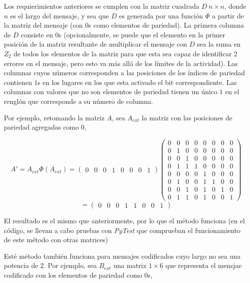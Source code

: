 \documentclass{article}
\begin{document}
Los requierimientos anteriores se cumplen con la matriz cuadrada $D\ n \times n$, donde $n$ es el largo del mensaje, y sea que $D$ es generada por una función $\Phi$ a partir de la matriz del mensaje (con $0$s como elementos de pariedad). La primera columna de $D$ consiste en $0$s (opcionalmente, se puede que el elemento en la primer posición de la matriz resultante de multiplicar el mensaje con $D$ sea la suma en $Z_2$ de todos los elementos de la matriz para que esta sea capaz de identificar 2 errores en el mensaje, pero esto va más allá de los límites de la actividad). Las columnas cuyos números corresponden a las posiciones de los índices de pariedad contienen $1$s en los lugares en los que esta activado el bit correspondiente. Las columnas con valores que no son elementos de pariedad tienen un único $1$ en el renglón que corresponde a su número de columna.

Por ejemplo, retomando la matriz $A$, sea $A_{ext}$ la matriz con las posiciones de pariedad agregadas como $0$,

$$
A' = A_{ext} \Phi(A_{ext}) = \begin{pmatrix}
    0 & 0 & 0 & 1 & 0 & 0 & 0 & 1
\end{pmatrix}
\begin{pmatrix}
    0 & 0 & 0 & 0 & 0 & 0 & 0 & 0 \\
    0 & 1 & 0 & 0 & 0 & 0 & 0 & 0 \\
    0 & 0 & 1 & 0 & 0 & 0 & 0 & 0 \\
    0 & 1 & 1 & 1 & 0 & 0 & 0 & 0 \\
    0 & 0 & 0 & 0 & 1 & 0 & 0 & 0 \\
    0 & 1 & 0 & 0 & 1 & 1 & 0 & 0 \\
    0 & 0 & 1 & 0 & 1 & 0 & 1 & 0 \\
    0 & 1 & 1 & 0 & 1 & 0 & 0 & 1
\end{pmatrix}
$$$$
= \begin{pmatrix}
    0 & 0 & 0 & 1 & 1 & 0 & 0 & 1
\end{pmatrix}
$$

El resultado es el mismo que anteriormente, por lo que el método funciona (en el código, se llevan a cabo pruebas con \textit{PyTest} que comprueban el funcionamiento de este método con otras matrices)

Esté método también funciona para mensajes codificados cuyo largo no sea una potencia de $2$. Por ejemplo, sea $B_{ext}$ una matrix $1 \times 6$ que representa el mensjae codificado con los elementos de pariedad como $0$s,
\end{document}
